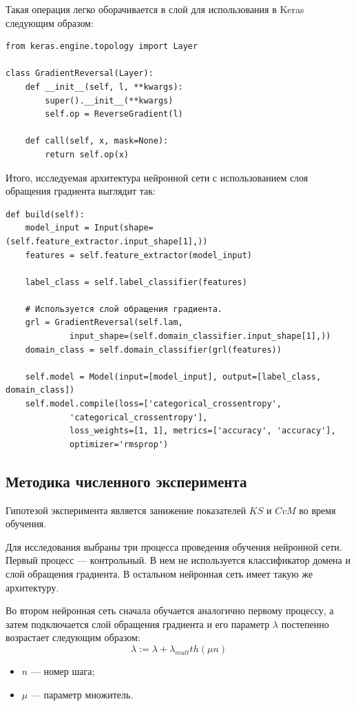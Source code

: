 \documentclass[14pt, a4paper]{extarticle}
\begin{document}
Такая операция легко оборачивается в слой для использования в Keras следующим образом: \\
\begin{verbatim}
from keras.engine.topology import Layer

class GradientReversal(Layer):
    def __init__(self, l, **kwargs):
        super().__init__(**kwargs)
        self.op = ReverseGradient(l)

    def call(self, x, mask=None):
        return self.op(x)
\end{verbatim}

Итого, исследуемая архитектура нейронной сети с использованием слоя обращения градиента выглядит так:
\begin{verbatim}
def build(self):
    model_input = Input(shape=(self.feature_extractor.input_shape[1],))
    features = self.feature_extractor(model_input)

    label_class = self.label_classifier(features)

    # Используется слой обращения градиента.
    grl = GradientReversal(self.lam, 
             input_shape=(self.domain_classifier.input_shape[1],))
    domain_class = self.domain_classifier(grl(features))

    self.model = Model(input=[model_input], output=[label_class, domain_class])
    self.model.compile(loss=['categorical_crossentropy', 
             'categorical_crossentropy'],
             loss_weights=[1, 1], metrics=['accuracy', 'accuracy'],
             optimizer='rmsprop')
\end{verbatim}

\subsection*{Методика численного эксперимента}

Гипотезой эксперимента является занижение показателей $KS$ и $CvM$ во время обучения.

Для исследования выбраны три процесса проведения обучения нейронной сети.
Первый процесс — контрольный. В нем не используется классификатор домена и слой обращения градиента. В остальном нейронная сеть имеет такую же архитектуру.

Во втором нейронная сеть сначала обучается аналогично первому процессу, а затем подключается слой обращения градиента и его параметр $\lambda$ постепенно возрастает следующим образом:
\begin{equation*}
	\lambda := \lambda + \lambda_{mult} th(\mu n)
\end{equation*}
\begin{itemize}
	\item $n$ — номер шага;
	\item $\mu$ — параметр множитель.
\end{itemize}
\end{document}
